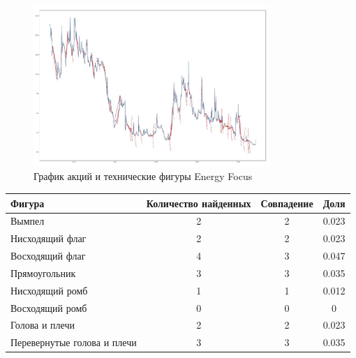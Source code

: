 \documentclass[bachelor, och, coursework]{SCWorks}
\begin{document}
    \begin{figure}[H]
        \centering
        \includegraphics[width=0.8\textwidth]{pic/EFOI.jpg}
        \caption{График акций и технические фигуры Energy Focus}
    \end{figure}
   
    \begin{table}[!hbt]
        \centering
        \begin{tabular}{|l|c|c|c|}
        \hline
        Фигура                      & \multicolumn{1}{l|}{Количество найденных} & Совпадение & Доля  \\ \hline
        Вымпел                      & 2                                         & 2          & 0.023 \\ \hline
        Нисходящий флаг             & 2                                         & 2          & 0.023 \\ \hline
        Восходящий флаг             & 4                                         & 3          & 0.047 \\ \hline
        Прямоугольник               & 3                                         & 3          & 0.035 \\ \hline
        Нисходящий ромб             & 1                                         & 1          & 0.012 \\ \hline
        Восходящий ромб             & 0                                         & 0          & 0     \\ \hline
        Голова и плечи              & 2                                         & 2          & 0.023 \\ \hline
        Перевернутые голова и плечи & 3                                         & 3          & 0.035 \\ \hline
        \end{tabular}
        \end{table}
\end{document}
